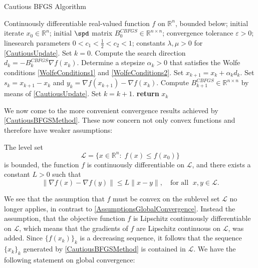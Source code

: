 \begin{algorithm}[H]
	\caption{Cautious BFGS Algorithm}\label{CautiousBFGSMethod}
	\begin{algorithmic}[1]
        \State Continuously differentiable real-valued function $f$ on $\mathbb{R}^n$, bounded below; initial iterate $x_0 \in \mathbb{R}^n$; initial $\spd$ matrix $B^{CBFGS}_0 \in \mathbb{R}^{n \times n}$; convergence tolerance $\varepsilon > 0$; linesearch parameters $0 < c_1 < \frac{1}{2} < c_2 < 1$; constants $\lambda, \mu > 0$ for \cref{CautiousUpdate}. Set $k = 0$.
            \State Compute the search direction $d_k = - B^{CBFGS}_k \nabla f(x_k)$.
            \State Determine a stepsize $\alpha_k > 0$ that satisfies the Wolfe conditions \cref{WolfeConditions1} and \cref{WolfeConditions2}. 
            \State Set $x_{k+1} = x_k + \alpha_k d_k$.
            \State Set $s_k = x_{k+1} - x_k$ and $y_k = \nabla f(x_{k+1}) - \nabla f(x_k)$.
            \State Compute $B^{CBFGS}_{k+1} \in \mathbb{R}^{n \times n}$ by means of \cref{CautiousUpdate}. 
            \State Set $k = k+1$.
		\EndWhile
		\State \textbf{return} $x_k$
    \end{algorithmic}
\end{algorithm}

We now come to the more convenient convergence results achieved by \cref{CautiousBFGSMethod}. These now concern not only convex functions and therefore have weaker assumptions:

\begin{assumption}\label{CautiousAssumption}
    The level set
    \begin{equation*}
        \mathcal{L} = \{ x \in \mathbb{R}^n \colon \; f(x) \leq f(x_0) \}
    \end{equation*}    
    is bounded, the function $f$ is continuously differentiable on $\mathcal{L}$, and there exists a constant $L > 0$ such that
    \begin{equation}\label{CautiousAssumptionLipschitz}
        \lVert \nabla f(x) - \nabla f(y) \rVert \leq L \lVert x - y \rVert, \quad \text{for all } \; x,y \in \mathcal{L}.
    \end{equation}
\end{assumption}

We see that the assumption that $f$ must be convex on the sublevel set $\mathcal{L}$ no longer applies, in contrast to \cref{AssumptionsGlobalConvergence}. Instead the assumption, that the objective function $f$ is Lipschitz continuously differentiable on $\mathcal{L}$, which means that the gradients of $f$ are Lipschitz continuous on $\mathcal{L}$, was added. Since $\{ f(x_k) \}_k$ is a decreasing sequence, it follows that the sequence $\{ x_k \}_k$ generated by \cref{CautiousBFGSMethod} is contained in $\mathcal{L}$. We have the following statement on global convergence:


